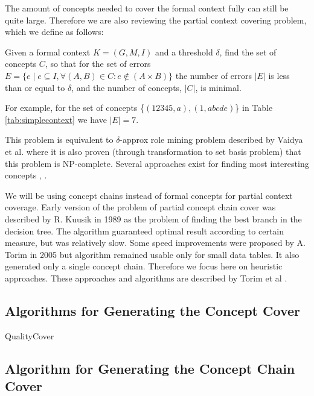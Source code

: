 \documentclass[acmconf,authordraft]{acmart}
\begin{document}
The amount of concepts needed to cover the formal context fully can still be quite large. Therefore we are also reviewing the partial context covering problem, which we define as follows:

\begin{definition}
\label{def_errors}

Given a formal context $ K = (G, M, I)$ and a threshold $\delta$, find the set of concepts $C$, so that for the set of errors $E = \{e \mid e \subseteq I, \forall (A, B) \in C: e \notin (A \times B)  \}$ the number of errors $|E|$ is less than or equal to $\delta$, and the number of concepts, $|C|$, is minimal.

\end{definition}

For example, for the set of concepts \{${(12345, a), (1, abcde)}$\} in Table \ref{tab:simplecontext}  we have $|E|=7$.

This problem is equivalent to $\delta$-approx role mining problem described by Vaidya et al. \cite{vaidya_role_2007} where it is also proven (through transformation to set basis problem) that this problem is NP-complete. Several approaches exist for finding most interesting concepts \cite{kuznetsov_concept_2015}, \cite{kuznetsov_stability_2007}.

We will be using concept chains instead of formal concepts for partial context coverage. Early version of the problem of partial concept chain cover was described by R. Kuusik in 1989 \cite{kuusik_application_1989} as the problem of finding the best branch in the decision tree. The algorithm guaranteed optimal result according to certain measure, but was relatively slow. Some speed improvements were proposed by A. Torim in 2005 \cite{torim_describing_2005} but algorithm remained usable only for small data tables. It also generated only a single concept chain. Therefore we focus here on heuristic approaches. These approaches and algorithms are described by Torim et al \cite{torim_covering_2019}.

\subsection{Algorithms for Generating the Concept Cover}
QualityCover

\subsection{Algorithm for Generating the Concept Chain Cover}
\end{document}
